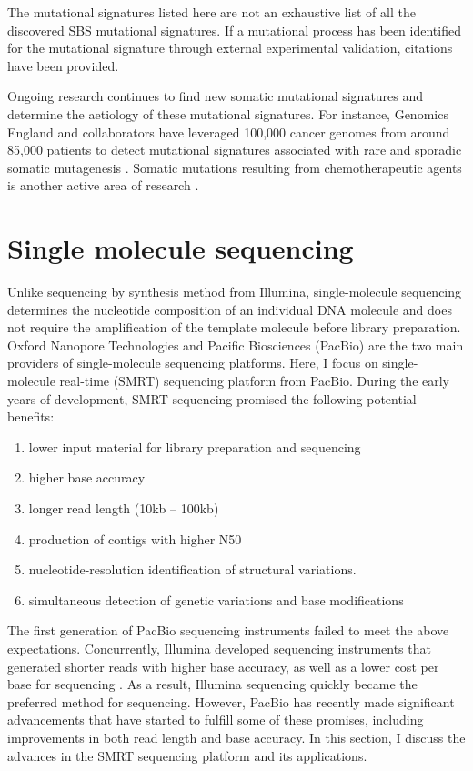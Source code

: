 The mutational signatures listed here are not an exhaustive list of all the discovered SBS mutational signatures. If a mutational process has been identified for the mutational signature through external experimental validation, citations have been provided. 

Ongoing research continues to find new somatic mutational signatures and determine the aetiology of these mutational signatures. For instance, Genomics England and collaborators have leveraged 100,000 cancer genomes from around 85,000 patients to detect mutational signatures associated with rare and sporadic somatic mutagenesis \cite{Degasperi2022-qe}. Somatic mutations resulting from chemotherapeutic agents is another active area of research \cite{Pich2019-ja, Aitken2020-sa}. 

\section{Single molecule sequencing}

Unlike sequencing by synthesis method from Illumina, single-molecule sequencing determines the nucleotide composition of an individual DNA molecule and does not require the amplification of the template molecule before library preparation. Oxford Nanopore Technologies and Pacific Biosciences (PacBio) are the two main providers of single-molecule sequencing platforms. Here, I focus on single-molecule real-time (SMRT) sequencing platform from PacBio. During the early years of development, SMRT sequencing promised the following potential benefits:

\begin{enumerate}
\item lower input material for library preparation and sequencing
\item higher base accuracy
\item longer read length (10kb – 100kb)
\item production of contigs with higher N50
\item nucleotide-resolution identification of structural variations. 
\item simultaneous detection of genetic variations and base modifications
\end{enumerate}

The first generation of PacBio sequencing instruments failed to meet the above expectations. Concurrently, Illumina developed sequencing instruments that generated shorter reads with higher base accuracy, as well as a lower cost per base for sequencing \cite{Bentley2008-kl}. As a result, Illumina sequencing quickly became the preferred method for sequencing. However, PacBio has recently made significant advancements that have started to fulfill some of these promises, including improvements in both read length and base accuracy. In this section, I discuss the advances in the SMRT sequencing platform and its applications.

